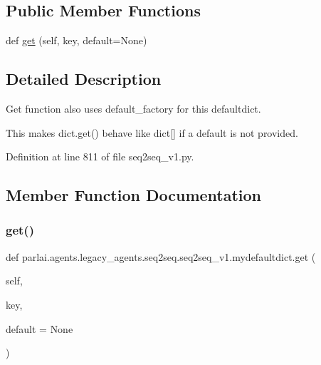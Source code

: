 \subsection*{Public Member Functions}
\begin{DoxyCompactItemize}
\item 
def \hyperlink{classparlai_1_1agents_1_1legacy__agents_1_1seq2seq_1_1seq2seq__v1_1_1mydefaultdict_aa078ac7ad7ce0d11a8aba0834acb4831}{get} (self, key, default=None)
\end{DoxyCompactItemize}


\subsection{Detailed Description}
\begin{DoxyVerb}Get function also uses default_factory for this defaultdict.

This makes dict.get() behave like dict[] if a default is not provided.
\end{DoxyVerb}
 

Definition at line 811 of file seq2seq\+\_\+v1.\+py.



\subsection{Member Function Documentation}
\mbox{\label{classparlai_1_1agents_1_1legacy__agents_1_1seq2seq_1_1seq2seq__v1_1_1mydefaultdict_aa078ac7ad7ce0d11a8aba0834acb4831}} 
\subsubsection{\texorpdfstring{get()}{get()}}
{\footnotesize\ttfamily def parlai.\+agents.\+legacy\+\_\+agents.\+seq2seq.\+seq2seq\+\_\+v1.\+mydefaultdict.\+get (\begin{DoxyParamCaption}\item[{}]{self,  }\item[{}]{key,  }\item[{}]{default = {\ttfamily None} }\end{DoxyParamCaption})}


